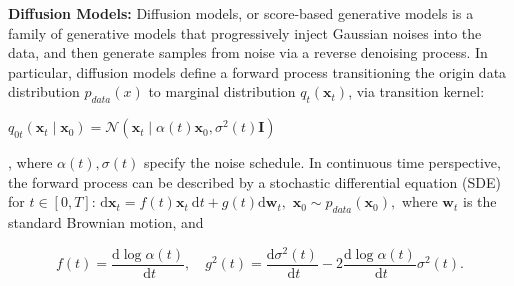 \documentclass{article} %
\newcommand{\jian}[1]{\textcolor{red}{#1}}
\begin{document}
\noindent
{\bf Diffusion Models:}
Diffusion models, or score-based generative models \cite{ho2020denoising, song2020denoising} is a family of generative models that progressively inject Gaussian noises into the data, and then generate samples from noise via a reverse denoising process.
In particular, diffusion models define a forward process transitioning the origin data distribution $p_{data}(x)$ to marginal distribution $q_t(\boldsymbol{x}_t)$, via transition kernel: \begin{small}$ q_{0 t}\left(\boldsymbol{x}_t \mid \boldsymbol{x}_0\right)=\mathcal{N}\left(\boldsymbol{x}_t \mid \alpha(t) \boldsymbol{x}_0, \sigma^2(t) \boldsymbol{I}\right)$\end{small}, where $\alpha(t), \sigma(t)$ specify the noise schedule. In continuous time perspective, the forward process can be described by a stochastic differential equation (SDE) \cite{song2020score, lu2022dpm, karras2022elucidating} for $t\in[0, T]$:
$
    \mathrm{d} \boldsymbol{x}_t=f(t) \boldsymbol{x}_t \mathrm{~d} t+g(t) \mathrm{d} \boldsymbol{w}_t, \,\, \boldsymbol{x}_0 \sim p_{data}\left(\boldsymbol{x}_0\right),
$
where $\boldsymbol{w}_t$ is the standard Brownian motion, and
\begin{small}
\begin{equation}
    f(t)=\frac{\mathrm{d} \log \alpha(t)}{\mathrm{~d} t}, \quad g^2(t)=\frac{\mathrm{d} \sigma^2(t)}{\mathrm{~d} t}-2 \frac{\mathrm{d} \log \alpha(t)}{\mathrm{~d} t} \sigma^2(t).
\end{equation}
\end{small}
\end{document}
